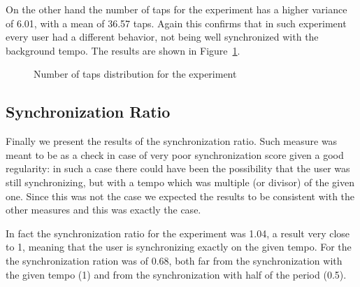 On the other hand the number of taps for the \testsecond experiment has a higher variance of 6.01, with a mean of 36.57 taps. Again this confirms that in such experiment every user had a different behavior, not being well synchronized with the background tempo. The results are shown in Figure~\ref{fig:taps2}.

\begin{figure}[h!t]
\centering
	{\setlength{\fboxsep}{1.5pt}
	 }
\caption{Number of taps distribution for the \testsecond experiment}
\label{fig:taps2}
\end{figure}

\subsection{Synchronization Ratio}
Finally we present the results of the synchronization ratio. Such measure was meant to be as a check in case of very poor synchronization score given a good regularity: in such a case there could have been the possibility that the user was still synchronizing, but with a tempo which was multiple (or divisor) of the given one.
Since this was not the case we expected the results to be consistent with the other measures and this was exactly the case.

In fact the synchronization ratio for the \testfirst experiment was 1.04, a result very close to 1, meaning that the user is synchronizing exactly on the given tempo.
For the \testsecond the synchronization ration was of 0.68, both far from the synchronization with the given tempo (1) and from the synchronization with half of the period (0.5).